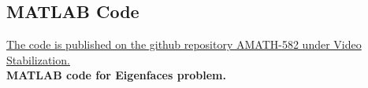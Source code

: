 \documentclass{article}
\begin{document}
\begin{appendices}
\pagebreak

\section{MATLAB Code}
\href{https://github.com/cssubedi/AMATH-582}{The code is published on the github repository AMATH-582 under Video Stabilization.} \\

\textbf{MATLAB code for Eigenfaces problem.}


\end{appendices}
\end{document}
